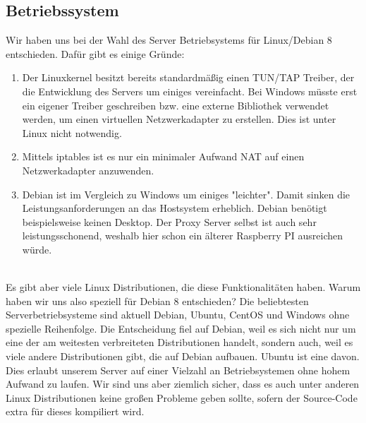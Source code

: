 \subsection{Betriebssystem}
Wir haben uns bei der Wahl des Server Betriebsystems für Linux/Debian 8 entschieden. Dafür gibt es einige Gründe:
\\
\begin{enumerate}
    \item Der Linuxkernel besitzt bereits standardmäßig einen TUN/TAP Treiber, der die Entwicklung des Servers um einiges vereinfacht. Bei Windows müsste erst ein eigener Treiber geschreiben bzw. eine externe Bibliothek verwendet werden, um einen virtuellen Netzwerkadapter zu erstellen. Dies ist unter Linux nicht notwendig.
    \item Mittels iptables ist es nur ein minimaler Aufwand NAT auf einen Netzwerkadapter anzuwenden. 
    \item Debian ist im Vergleich zu Windows um einiges "leichter". Damit sinken die Leistungsanforderungen an das Hostsystem erheblich. Debian benötigt beispielsweise keinen Desktop. Der Proxy Server selbst ist auch sehr leistungsschonend, weshalb hier schon ein älterer Raspberry PI ausreichen würde.
\end{enumerate}
\ \\
Es gibt aber viele Linux Distributionen, die diese Funktionalitäten haben. Warum haben wir uns also speziell für Debian 8 entschieden? Die beliebtesten Serverbetriebsysteme sind aktuell Debian, Ubuntu, CentOS und Windows ohne spezielle Reihenfolge. Die Entscheidung fiel auf Debian, weil es sich nicht nur um eine der am weitesten verbreiteten Distributionen handelt, sondern auch, weil es viele andere Distributionen gibt, die auf Debian aufbauen. Ubuntu ist eine davon. Dies erlaubt unserem Server auf einer Vielzahl an Betriebsystemen ohne hohem Aufwand zu laufen. Wir sind uns aber ziemlich sicher, dass es auch unter anderen Linux Distributionen keine großen Probleme geben sollte, sofern der Source-Code extra für dieses kompiliert wird.

